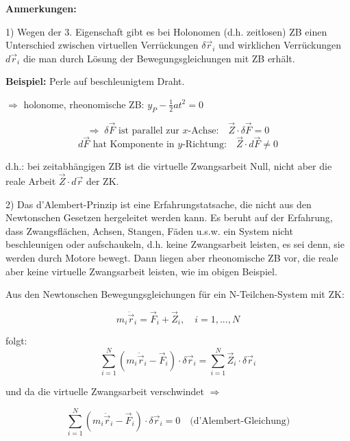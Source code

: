 \documentclass[10pt, letterpaper]{article}
\begin{document}
\textbf{Anmerkungen:}

1) Wegen der 3. Eigenschaft gibt es bei Holonomen (d.h. zeitlosen) ZB einen Unterschied zwischen virtuellen Verrückungen $\delta\vec{r}_i$ und wirklichen Verrückungen $d\vec{r}_i$ die man durch Lösung der Bewegungsgleichungen mit ZB erhält.

\textbf{Beispiel:} Perle auf beschleunigtem Draht.


$\Rightarrow$ holonome, rheonomische ZB: $y_P - \frac{1}{2}at^2 = 0$

\[
\Rightarrow \; \delta \vec{F} \text{ ist parallel zur } x\text{-Achse:} \quad \vec{Z} \cdot \delta \vec{F} = 0
\]
\[
d \vec{F} \text{ hat Komponente in } y\text{-Richtung:} \quad \vec{Z} \cdot d \vec{F} \neq 0
\]

d.h.: bei zeitabhängigen ZB ist die virtuelle Zwangsarbeit Null, nicht aber die reale Arbeit $\vec{Z} \cdot d\vec{r}$ der ZK.

2) Das d'Alembert-Prinzip ist eine Erfahrungstatsache, die nicht aus den Newtonschen Gesetzen hergeleitet werden kann. Es beruht auf der Erfahrung, dass Zwangsflächen, Achsen, Stangen, Fäden u.s.w. ein System nicht beschleunigen oder aufschaukeln, d.h. keine Zwangsarbeit leisten, es sei denn, sie werden durch Motore bewegt. Dann liegen aber rheonomische ZB vor, die reale aber keine virtuelle Zwangsarbeit leisten, wie im obigen Beispiel.

Aus den Newtonschen Bewegungsgleichungen für ein N-Teilchen-System mit ZK:

\[m_i \ddot{\vec{r}}_i = \vec{F}_i + \vec{Z}_i, \quad i=1,...,N\]

folgt: \[\sum_{i=1}^N (m_i \ddot{\vec{r}}_i-\vec{F}_i) \cdot \delta \vec{r}_i = \sum_{i=1}^N \vec{Z}_i \cdot \delta \vec{r}_i\]

und da die virtuelle Zwangsarbeit verschwindet $\Rightarrow$

\[\sum_{i=1}^N (m_i \ddot{\vec{r}}_i-\vec{F}_i) \cdot \delta \vec{r}_i = 0 \quad \text{(d'Alembert-Gleichung)}\]
\end{document}
